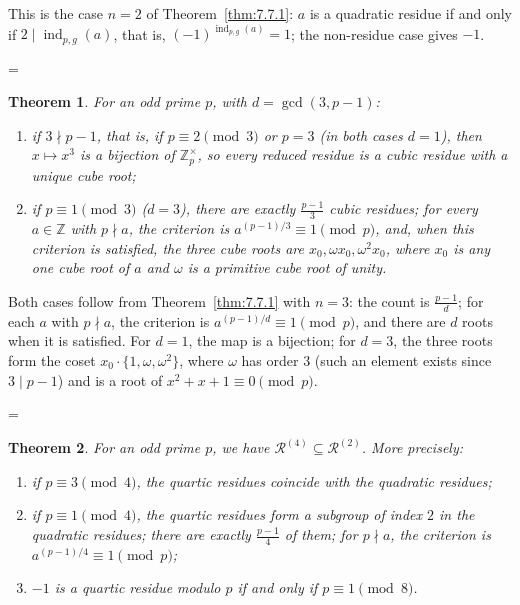 \documentclass[11pt]{article}
\makeatletter
\theoremstyle{ntstyle}
\newtheorem{theorem}{Theorem}[subsection]
\let\nt@closedisplay\]
\def\nt@guardedclose{\@ifnextchar\par{\nt@closeafterpar}{\@ifnextchar\end{\postdisplaypenalty\@M\nt@closedisplay}{\nt@closedisplay}}}
\def\nt@closeafterpar\par{\@ifnextchar\par{\nt@closeafterpar}{\@ifnextchar\end{\postdisplaypenalty\@M\nt@closedisplay\par}{\nt@closedisplay\par}}}
\renewenvironment{proof}[1][\proofname]{\par
  \pushQED{\qed}\normalfont\topsep\medskipamount\edef\nt@afterproof{\@endparpenalty=\the\@endparpenalty\relax}\@beginparpenalty\@M\@endparpenalty\@M\let\]\nt@guardedclose\trivlist\item[]\textit{#1\@addpunct{.}} \ignorespaces}{\ifvmode\addpenalty\@M\fi\popQED\nt@afterproof\endtrivlist\@endpefalse}
\newcommand{\ZmodUnits}[1]{\mathbb{Z}_{#1}^{\times}}
\DeclareMathOperator{\ind}{ind}
\makeatother
\begin{document}
\begin{proof} This is the case $n = 2$ of Theorem~\ref{thm:7.7.1}:
	$a$ is a quadratic residue if and only if $2 \mid \ind_{p,g}(a)$,
	that is, $(-1)^{\ind_{p,g}(a)} = 1$; the non-residue case
	gives $-1$.

\end{proof}
\begin{theorem}\label{thm:7.7.5} For an odd prime
	$p$, with $d = \gcd(3, p-1)$:

	\begin{enumerate}[label={\alph*)}]
		\item if $3 \nmid p - 1$, that is, if $p \equiv 2 \pmod{3}$ or $p = 3$
		      (in both cases $d = 1$), then $x \mapsto x^{3}$ is a bijection of
		      $\ZmodUnits{p}$, so every reduced residue is a cubic residue
		      with a unique cube root;
		\item if $p \equiv 1 \pmod{3}$ ($d = 3$), there are exactly
		      $\frac{p-1}{3}$ cubic residues; for every $a\in\mathbb{Z}$ with
		      $p\nmid a$, the criterion is $a^{(p-1)/3} \equiv 1\pmod{p}$,
		      and, when this criterion is satisfied, the three cube roots are $x_0, \omega x_0,
		      \omega^{2} x_0$, where $x_0$ is any one cube root of $a$ and $\omega$ is a primitive cube root of unity.
	\end{enumerate}

\end{theorem}

\begin{proof} Both cases follow from Theorem~\ref{thm:7.7.1} with $n = 3$:
	the count is $\frac{p-1}{d}$; for each $a$ with $p\nmid a$, the criterion
	is $a^{(p-1)/d} \equiv 1 \pmod{p}$, and there are $d$ roots when it is
	satisfied. For $d = 1$, the map is a bijection; for
	$d = 3$, the three roots form the coset $x_0 \cdot \{1, \omega,
		\omega^{2}\}$, where $\omega$ has order $3$ (such an element exists since $3 \mid
		p-1$) and is a root of $x^{2} + x + 1 \equiv 0 \pmod{p}$.

\end{proof}
\begin{theorem}\label{thm:7.7.6} For an odd prime $p$,
	we have $\mathcal{R}^{(4)}\subseteq\mathcal{R}^{(2)}$. More precisely:

	\begin{enumerate}[label={\alph*)}]
		\item if $p \equiv 3 \pmod{4}$, the quartic residues
		      coincide with the quadratic residues;
		\item if $p \equiv 1 \pmod{4}$, the quartic residues form a
		      subgroup of index $2$ in the quadratic residues; there are exactly
		      $\frac{p-1}{4}$ of them; for $p\nmid a$, the criterion is
		      $a^{(p-1)/4} \equiv 1 \pmod{p}$;
		\item $-1$ is a quartic residue modulo $p$ if and only if
		      $p\equiv1\pmod8$.
	\end{enumerate}

\end{theorem}
\end{document}
